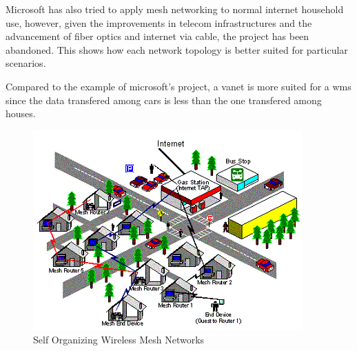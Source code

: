 		Microsoft has also tried to apply mesh networking to normal internet household use, however, given the improvements in telecom infrastructures and the advancement of fiber optics and internet via cable, the project has been abandoned.
		This shows how each network topology is better suited for particular scenarios.
		
		Compared to the example of microsoft's project, a vanet is more suited for a wms since the data transfered among cars is less than the one transfered among houses.
		
		\noindent
		\begin{minipage}{0.52\textwidth}%
			\begin{figure}[H]
				\centering
				\includegraphics[width=\textwidth]{resources/img/chap4/wms_microsoft}
				\caption[Self Organizing Wireless Mesh Networks]{Self Organizing Wireless Mesh Networks\cite{BADIS2015653}}
				\label{img:wms_microsoft}
			\end{figure}
		\end{minipage}%
		\hfill%
